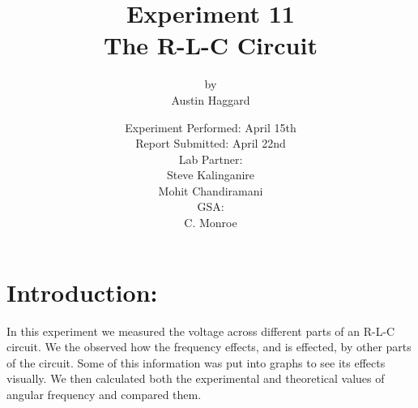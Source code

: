 \documentclass{article}
\title{Experiment 11 \\ The R-L-C Circuit}
\author{by \\ Austin Haggard}
\date{
	Experiment Performed: April 15th \\
	Report Submitted: April 22nd \\[11pt]
	Lab Partner: \\ Steve Kalinganire \\ Mohit Chandiramani \\[11pt] 
	GSA: \\ C. Monroe
}
\begin{document}
\maketitle
\thispagestyle{empty}
\newpage

\section*{Introduction:}
\setcounter{page}{1}
In this experiment we measured the voltage across different parts of an R-L-C circuit.  We the observed how the frequency effects, and is effected, by other parts of the circuit.  Some of this information was put into graphs to see its effects visually.  We then calculated both the experimental and theoretical values of angular frequency and compared them.
\newpage

\end{document}
